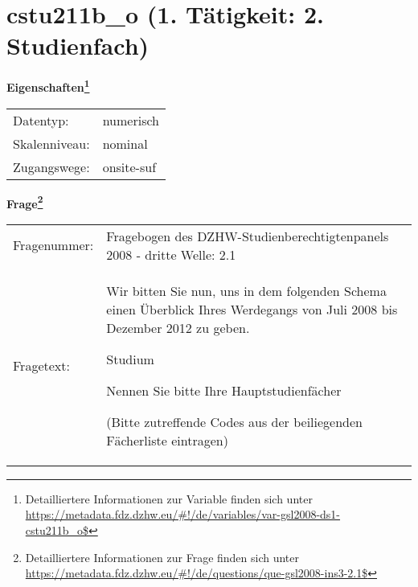 
    \setcounter{footnote}{0}

    \vspace*{-1.8cm}
	\section{cstu211b\_o (1. Tätigkeit: 2. Studienfach)}
	\label{section:cstu211b_o}



    \vspace*{0.5cm}
    \noindent\textbf{Eigenschaften\footnote{Detailliertere Informationen zur Variable finden sich unter
		\url{https://metadata.fdz.dzhw.eu/\#!/de/variables/var-gsl2008-ds1-cstu211b_o$}}}\\
	\begin{tabularx}{\hsize}{@{}lX}
	Datentyp: & numerisch \\
	Skalenniveau: & nominal \\
	Zugangswege: &
	  onsite-suf
 \\
    \end{tabularx}



				\vspace*{0.5cm}
                \noindent\textbf{Frage\footnote{Detailliertere Informationen zur Frage finden sich unter
		              \url{https://metadata.fdz.dzhw.eu/\#!/de/questions/que-gsl2008-ins3-2.1$}}}\\
				\begin{tabularx}{\hsize}{@{}lX}
					Fragenummer: &
					  Fragebogen des DZHW-Studienberechtigtenpanels 2008 - dritte Welle:
					  2.1
 \\
					Fragetext: & Wir bitten Sie nun, uns in dem folgenden Schema einen Überblick Ihres Werdegangs von Juli 2008 bis Dezember 2012 zu geben.\par  Studium\par  Nennen Sie bitte Ihre Hauptstudienfächer\par  (Bitte zutreffende Codes aus der beiliegenden Fächerliste eintragen) \\
				\end{tabularx}





